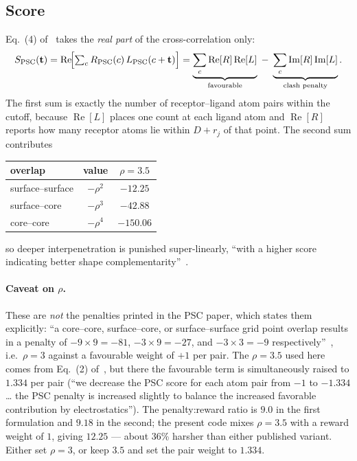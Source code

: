 \documentclass[11pt,a4paper]{article}
\newcommand{\Rgrid}{R}
\newcommand{\Lgrid}{L}
\newcommand{\Spsc}{S_{\mathrm{PSC}}}
\begin{document}
\subsection{Score}

Eq.~(4) of~\cite{ChenWeng2003psc} takes the \emph{real part} of the
cross-correlation only:
\begin{equation}
  \Spsc(\mathbf{t})
  = \operatorname{Re}\!\Bigl[\textstyle\sum_{c}
      \Rgrid_{\mathrm{PSC}}(c)\,\Lgrid_{\mathrm{PSC}}(c+\mathbf{t})\Bigr]
  = \underbrace{\sum_c \operatorname{Re}[\Rgrid]\operatorname{Re}[\Lgrid]}_{\text{favourable}}
  \;-\; \underbrace{\sum_c \operatorname{Im}[\Rgrid]\operatorname{Im}[\Lgrid]}_{\text{clash penalty}}.
  \label{eq:psc}
\end{equation}
The first sum is exactly the number of receptor--ligand atom pairs within the
cutoff, because $\operatorname{Re}[\Lgrid]$ places one count at each ligand
atom and $\operatorname{Re}[\Rgrid]$ reports how many receptor atoms lie within
$D+r_j$ of that point. The second sum contributes
\begin{center}
\begin{tabular}{lcc}
  \toprule
  overlap & value & $\rho=3.5$ \\
  \midrule
  surface--surface & $-\rho^2$ & $-12.25$ \\
  surface--core    & $-\rho^3$ & $-42.88$ \\
  core--core       & $-\rho^4$ & $-150.06$ \\
  \bottomrule
\end{tabular}
\end{center}
so deeper interpenetration is punished super-linearly, ``with a higher score
indicating better shape complementarity''~\cite{ChenWeng2003psc}.

\paragraph{Caveat on $\rho$.} These are \emph{not} the penalties printed in
the PSC paper, which states them explicitly: ``a core--core, surface--core, or
surface--surface grid point overlap results in a penalty of $-9\times9=-81$,
$-3\times9=-27$, and $-3\times3=-9$ respectively''~\cite{ChenWeng2003psc},
i.e.\ $\rho = 3$ against a favourable weight of $+1$ per pair. The
$\rho = 3.5$ used here comes from Eq.~(2) of~\cite{Chen2003zdock}, but there
the favourable term is simultaneously raised to $1.334$ per pair (``we decrease
the PSC score for each atom pair from $-1$ to $-1.334$ \ldots{} the PSC penalty
is increased slightly to balance the increased favorable contribution by
electrostatics''). The penalty:reward ratio is $9.0$ in the first formulation
and $9.18$ in the second; the present code mixes $\rho = 3.5$ with a reward
weight of $1$, giving $12.25$ --- about 36\% harsher than either published
variant. Either set $\rho = 3$, or keep $3.5$ and set the pair weight to
$1.334$.
\end{document}
